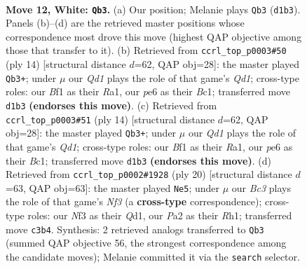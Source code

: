 \documentclass[11pt]{article}
\begin{document}
\begin{figure}[p]\centering
\begin{subfigure}{0.46\textwidth}\centering
\resizebox{\linewidth}{!}{%
\newchessgame
\chessboard[
  setfen={1rb1r1k1/p1p1qppp/2n1pn2/1pPp4/3P4/2B1PNP1/PP3P1P/R2QKB1R w Q - 2 12},
  showmover=false,
  pgfstyle=straightmove, color=movearrow, markmove={d1-b3}
]}
\caption{}
\end{subfigure}\hfill
\begin{subfigure}{0.46\textwidth}\centering
\resizebox{\linewidth}{!}{%
\newchessgame
\chessboard[
  setfen={r1bq1rk1/pppp2pp/2n2n2/2P1pp2/8/2P2NP1/P2PPPBP/R1BQK2R w KQ - 5 8},
  showmover=false,
  pgfstyle=straightmove, color=movearrow, markmove={d1-b3}
]}
\caption{}
\end{subfigure}
\\[4pt]
\begin{subfigure}{0.46\textwidth}\centering
\resizebox{\linewidth}{!}{%
\newchessgame
\chessboard[
  setfen={r1bq1rk1/pppp2pp/2n2n2/2P1pp2/8/2P2NP1/P2PPPBP/R1BQK2R w KQ - 5 8},
  showmover=false,
  pgfstyle=straightmove, color=movearrow, markmove={d1-b3}
]}
\caption{}
\end{subfigure}\hfill
\begin{subfigure}{0.46\textwidth}\centering
\resizebox{\linewidth}{!}{%
\newchessgame
\chessboard[
  setfen={r1b2rk1/1pppqppp/2n1pn2/p1P5/3P4/P1B2NP1/1P2PPBP/R2QK2R w KQ - 0 11},
  showmover=false,
  pgfstyle=straightmove, color=movearrow, markmove={f3-e5}
]}
\caption{}
\end{subfigure}
\caption{\textbf{Move 12, White: \texttt{Qb3}.} (a) Our position; Melanie plays \texttt{Qb3} (\texttt{d1b3}). Panels (b)--(d) are the retrieved master positions whose correspondence most drove this move (highest QAP objective among those that transfer to it). (b) Retrieved from \texttt{ccrl\_top\_p0003\#50} (ply 14) [structural distance $d$=62, QAP obj=28]: the master played \texttt{Qb3+}; under $\mu$ our \emph{Qd1} plays the role of that game's \emph{Qd1}; cross-type roles: our \emph{B}f1 as their \emph{R}a1, our \emph{p}e6 as their \emph{B}c1; transferred move \texttt{d1b3} \textbf{(endorses this move)}. (c) Retrieved from \texttt{ccrl\_top\_p0003\#51} (ply 14) [structural distance $d$=62, QAP obj=28]: the master played \texttt{Qb3+}; under $\mu$ our \emph{Qd1} plays the role of that game's \emph{Qd1}; cross-type roles: our \emph{B}f1 as their \emph{R}a1, our \emph{p}e6 as their \emph{B}c1; transferred move \texttt{d1b3} \textbf{(endorses this move)}. (d) Retrieved from \texttt{ccrl\_top\_p0002\#1928} (ply 20) [structural distance $d$=63, QAP obj=63]: the master played \texttt{Ne5}; under $\mu$ our \emph{Bc3} plays the role of that game's \emph{Nf3} (a \textbf{cross-type} correspondence); cross-type roles: our \emph{N}f3 as their \emph{Q}d1, our \emph{P}a2 as their \emph{R}h1; transferred move \texttt{c3b4}. Synthesis: 2 retrieved analogs transferred to \texttt{Qb3} (summed QAP objective 56, the strongest correspondence among the candidate moves); Melanie committed it via the \texttt{search} selector.}
\label{fig:thought-m22}
\end{figure}
\end{document}
